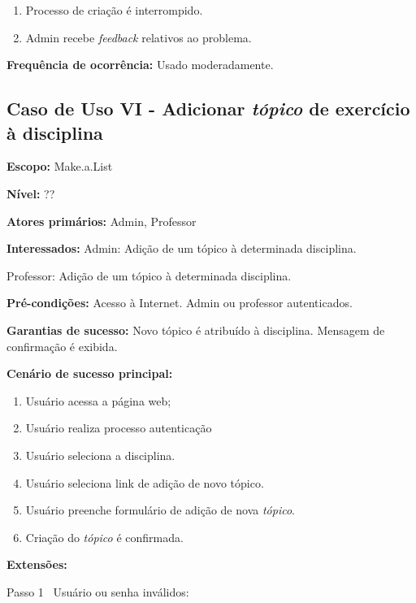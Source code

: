 \documentclass[12pt,oneside,a4paper,article]{abntex2}
\begin{document}
		\begin{enumerate}[label=\alph*.]	
			\item Processo de criação é interrompido.
			\item Admin recebe \textit{feedback} relativos ao problema.	
		\end{enumerate}
		
		
		\textbf{Frequência de ocorrência:} Usado moderadamente.
	
		\subsection{Caso de Uso VI - Adicionar \textit{tópico} de exercício à disciplina}
		
		\textbf{Escopo:} Make.a.List 
		
		\textbf{Nível:} ??
		
		\textbf{Atores primários:} Admin, Professor
		
		\textbf{Interessados:} Admin: Adição de um tópico à determinada disciplina.
		
		Professor: Adição de um tópico à determinada disciplina.
		
		\textbf{Pré-condições:} Acesso à Internet. Admin ou professor autenticados.
		
		\textbf{Garantias de sucesso:} Novo tópico é atribuído à disciplina. Mensagem de confirmação é exibida.
		
		\textbf{Cenário de sucesso principal:} 
		
		\begin{enumerate}
			\item Usuário acessa a página web;
			
			\item Usuário realiza processo autenticação
			
			\item Usuário seleciona a disciplina.
			
			\item Usuário seleciona link de adição de novo tópico.
			
			\item Usuário preenche formulário de adição de nova \textit{tópico}.
			
			\item Criação do \textit{tópico} é confirmada.
			
		\end{enumerate}
		
		\textbf{Extensões:} 
		
		Passo 1 \textrightarrow \ Usuário ou senha inválidos:
		
\end{document}

